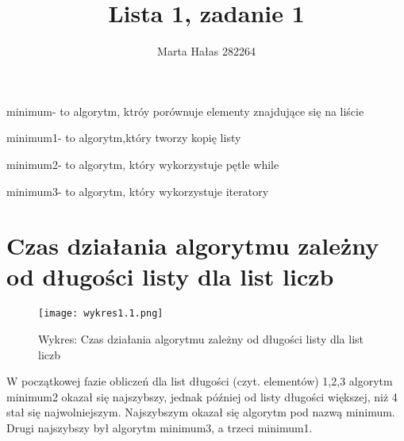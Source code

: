\documentclass{mwart}
\author{Marta Hałas 282264}
\title{\textbf{Lista 1, zadanie 1}}
\begin{document}
	\maketitle
	\medskip
	
	\begin{pysub}
		
	minimum- to algorytm, ktróy porównuje elementy znajdujące się na liście 
		
	\end{pysub}
	\begin{pysub}
	minimum1- to algorytm,który tworzy kopię listy  
		
	\end{pysub}
	\begin{pysub}
	minimum2- to algorytm, który wykorzystuje pętle while 
		
	\end{pysub}
	\begin{pysub}
		
	minimum3- to algorytm, który wykorzystuje iteratory 
		
	\end{pysub}
	
	\section{\textbf{Czas działania algorytmu zależny od długości listy dla list liczb}}\label{Czas działania algorytmu zależny od długości listy dla list liczb}
	
	\begin{figure}[h!]
		\begin{center}
			\texttt{[image: wykres1.1.png]}
			\caption{Wykres: Czas działania algorytmu zależny od długości listy dla list liczb}
		\end{center}
	\end{figure}
	
	\medskip
	\medskip
	\medskip
	\medskip
	\medskip
	
	\begin{pysub}
		
		W początkowej fazie obliczeń dla list długości (czyt. elementów) 1,2,3 algorytm minimum2 okazał się najszybszy, jednak później od listy długości większej, niż 4 stał się najwolniejszym. Najszybszym okazał się algorytm pod nazwą minimum. Drugi najszybszy był algorytm minimum3, a trzeci minimum1.
		
	\end{pysub}
	
	\medskip
	\medskip
	\medskip
	\medskip
	\medskip
	
\end{document}
